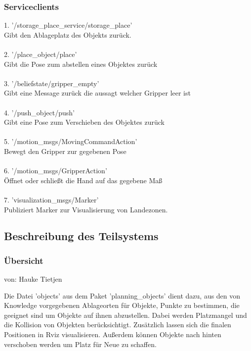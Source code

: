 \documentclass{suturo}
\makeatletter
\newcommand{\chapterauthor}[1]{%
  {\parindent0pt\vspace*{-27pt}%
  \linespread{0}\small\begin{flushright}von: #1\end{flushright}%
  \par\nobreak\vspace*{0pt}}
  \@afterheading%
}
\makeatother
\begin{document}
\subsubsection{Serviceclients}
1. '/storage\_place\_service/storage\_place' \\
Gibt den Ablageplatz des Objekts zur\"uck.\\ \\
2. '/place\_object/place' \\
Gibt die Pose zum abstellen eines Objektes zur\"uck\\ \\
3. '/beliefstate/gripper\_empty' \\
Gibt eine Message zurück die aussagt welcher Gripper leer ist\\ \\
4. '/push\_object/push' \\
Gibt eine Pose zum Verschieben des Objektes zur\"uck\\ \\
5. '/motion\_msgs/MovingCommandAction' \\
Bewegt den Gripper zur gegebenen Pose\\ \\
6. '/motion\_msgs/GripperAction' \\
Öffnet oder schließt die Hand auf das gegebene Maß\\ \\
7. 'visualization\_msgs/Marker' \\
Publiziert Marker zur Visualisierung von Landezonen.

\subsection{Beschreibung des Teilsystems}
\subsubsection{\"Ubersicht}
\chapterauthor{Hauke Tietjen}
Die Datei 'objects' aus dem Paket 'planning\_objects' dient dazu, aus den von Knowledge vorgegebenen Ablageorten für Objekte, Punkte zu bestimmen, die geeignet sind um Objekte auf ihnen abzustellen. Dabei werden Platzmangel und die Kollision von Objekten berücksichtigt. Zusätzlich lassen sich die finalen Positionen in Rviz visualisieren. Außerdem können Objekte nach hinten verschoben werden um Platz für Neue zu schaffen.
\end{document}
